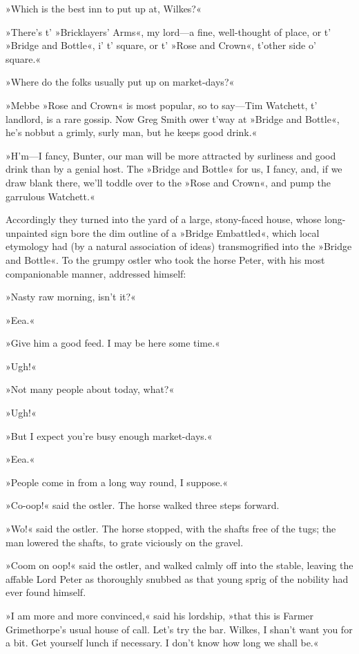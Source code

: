 »Which is the best inn to put up at, Wilkes?«

»There's t' »Bricklayers' Arms«, my lord—a fine, well-thought of place, or t' »Bridge and Bottle«, i' t' square, or t' »Rose and Crown«, t'other side o' square.«

»Where do the folks usually put up on market-days?«

»Mebbe »Rose and Crown« is most popular, so to say—Tim Watchett, t' landlord, is a rare gossip. Now Greg Smith ower t'way at »Bridge and Bottle«, he's nobbut a grimly, surly man, but he keeps good drink.«

»H'm—I fancy, Bunter, our man will be more attracted by surliness and good drink than by a genial host. The »Bridge and Bottle« for us, I fancy, and, if we draw blank there, we'll toddle over to the »Rose and Crown«, and pump the garrulous Watchett.«

Accordingly they turned into the yard of a large, stony-faced house, whose long-unpainted sign bore the dim outline of a »Bridge Embattled«, which local etymology had (by a natural association of ideas) transmogrified into the »Bridge and Bottle«. To the grumpy ostler who took the horse Peter, with his most companionable manner, addressed himself:

»Nasty raw morning, isn't it?«

»Eea.«

»Give him a good feed. I may be here some time.«

»Ugh!«

»Not many people about today, what?«

»Ugh!«

»But I expect you're busy enough market-days.«

»Eea.«

»People come in from a long way round, I suppose.«

»Co-oop!« said the ostler. The horse walked three steps forward.

»Wo!« said the ostler. The horse stopped, with the shafts free of the tugs; the man lowered the shafts, to grate viciously on the gravel.

»Coom on oop!« said the ostler, and walked calmly off into the stable, leaving the affable Lord Peter as thoroughly snubbed as that young sprig of the nobility had ever found himself.

»I am more and more convinced,« said his lordship, »that this is Farmer Grimethorpe's usual house of call. Let's try the bar. Wilkes, I shan't want you for a bit. Get yourself lunch if necessary. I don't know how long we shall be.«

